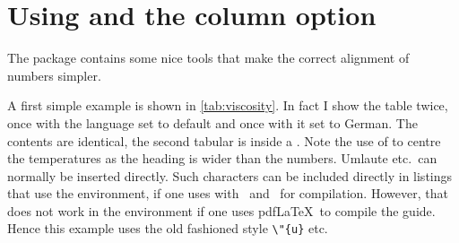 \section{Using  and the  column option}%
\label{sec:table:siunitx}

The  package contains some nice tools that make the
correct alignment of numbers simpler. 

A first simple example is shown in \cref{tab:viscosity}.
In fact I show the table twice, once
with the language set to default and once with it set to German. The
 contents are identical, the second tabular is inside a
. Note the use of
to centre the temperatures as the heading is wider than the numbers.
Umlaute etc.\ can normally be inserted directly.
Such characters can be included directly in listings that use the  environment,
if one uses  with \LuaLaTeX\ and \XeLaTeX\ for compilation.
However, that does not work in the  environment if one uses pdf\LaTeX\ to compile the guide.
Hence this example uses the old fashioned style \verb|\"{u}| etc.

